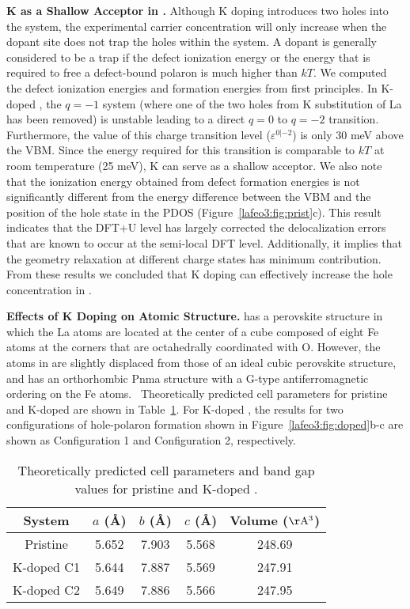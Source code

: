 \textbf{K as a Shallow Acceptor in .} Although K doping introduces two holes into the system, the experimental carrier concentration will only increase when the dopant site does not trap the holes within the system. A dopant is generally considered to be a trap if the defect ionization energy or the energy that is required to free a defect-bound polaron is much higher than $kT$. We computed the defect ionization energies and formation energies from first principles.
In K-doped , the $q = -1$ system (where one of the two holes from K substitution of La has been removed) is unstable leading to a direct $q = 0$ to $q = -2$ transition. Furthermore, the value of this charge transition level ($\varepsilon^{0|-2}$) is only 30 meV above the VBM. Since the energy required for this transition is comparable to $kT$ at room temperature (25 meV), K can serve as a shallow acceptor. We also note that the ionization energy obtained from defect formation energies is not significantly different from the energy difference between the VBM and the position of the hole state in the PDOS (Figure~\ref{lafeo3:fig:prist}c). This result indicates that the DFT+U level has largely corrected the delocalization errors that are known to occur at the semi-local DFT level. Additionally, it implies that the geometry relaxation at different charge states has minimum contribution.~\cite{smart2018fundamental,wu2017first} From these results we concluded that K doping can effectively increase the hole concentration in .

\textbf{Effects of K Doping on Atomic Structure.}  has a perovskite structure in which the La atoms are located at the center of a cube composed of eight Fe atoms at the corners that are octahedrally coordinated with O. However, the atoms in  are slightly displaced from those of an ideal cubic perovskite structure, and  has an orthorhombic Pnma structure with a G-type antiferromagnetic ordering on the Fe atoms.~\cite{beausoleil2014thermal} Theoretically predicted cell parameters for pristine and K-doped  are shown in Table~\ref{lafeo3:table}. For K-doped , the results for two configurations of hole-polaron formation shown in Figure~\ref{lafeo3:fig:doped}b-c are shown as Configuration 1 and Configuration 2, respectively.

\begin{table}[H]
    \footnotesize
    \centering
    \begin{tabular}{ccccc}
    \hline \hline
        System & $a$ (\AA{}) & $b$ (\AA{}) & $c$ (\AA{}) & Volume ($\rm \AA^3$) \\
    \hline
    Pristine    & 5.652 & 7.903 & 5.568 & 248.69 \\
    K-doped C1  & 5.644 & 7.887 & 5.569 & 247.91 \\
    K-doped C2  & 5.649 & 7.886 & 5.566 & 247.95 \\
    \hline \hline
    \end{tabular}
    \caption{Theoretically predicted cell parameters and band gap values for pristine  and K-doped .}
    \label{lafeo3:table}
\end{table}

